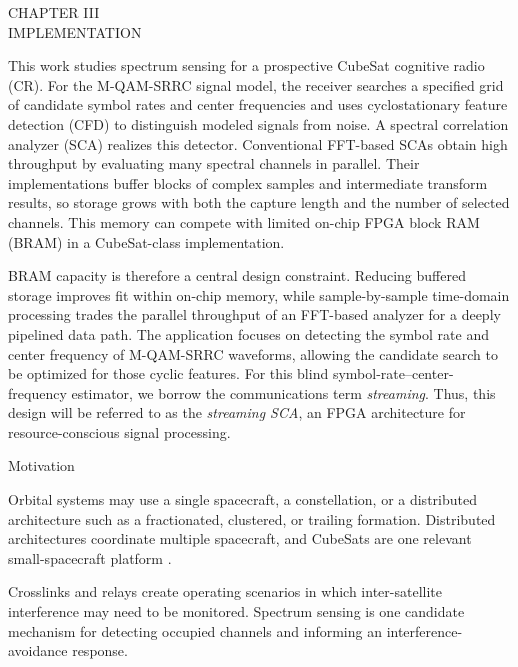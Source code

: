\newpage
{}

\begin{center}
  \vspace*{1.65in}
  CHAPTER III\\
  IMPLEMENTATION
\end{center}

\bigskip

This work studies spectrum sensing for a prospective CubeSat cognitive radio (CR).  For the M-QAM-SRRC signal model, the receiver searches a specified grid of candidate symbol rates and center frequencies and uses cyclostationary feature detection (CFD) to distinguish modeled signals from noise.  A spectral correlation analyzer (SCA) realizes this detector.  Conventional FFT-based SCAs obtain high throughput by evaluating many spectral channels in parallel.  Their implementations buffer blocks of complex samples and intermediate transform results, so storage grows with both the capture length and the number of selected channels.  This memory can compete with limited on-chip FPGA block RAM (BRAM) in a CubeSat-class implementation.

BRAM capacity is therefore a central design constraint.  Reducing buffered storage improves fit within on-chip memory, while sample-by-sample time-domain processing trades the parallel throughput of an FFT-based analyzer for a deeply pipelined data path.  The application focuses on detecting the symbol rate and center frequency of M-QAM-SRRC waveforms, allowing the candidate search to be optimized for those cyclic features.  For this blind symbol-rate--center-frequency estimator, we borrow the communications term \textit{streaming}.  Thus, this design will be referred to as the \textit{streaming SCA}, an FPGA architecture for resource-conscious signal processing.


\clearpage
%
%
\bigskip
{}
  \quad Motivation

Orbital systems may use a single spacecraft, a constellation, or a distributed architecture such as a fractionated, clustered, or trailing formation.  Distributed architectures coordinate multiple spacecraft, and CubeSats are one relevant small-spacecraft platform \cite{bandyopadhyay-15}.

Crosslinks and relays create operating scenarios in which inter-satellite interference may need to be monitored.  Spectrum sensing is one candidate mechanism for detecting occupied channels and informing an interference-avoidance response.

